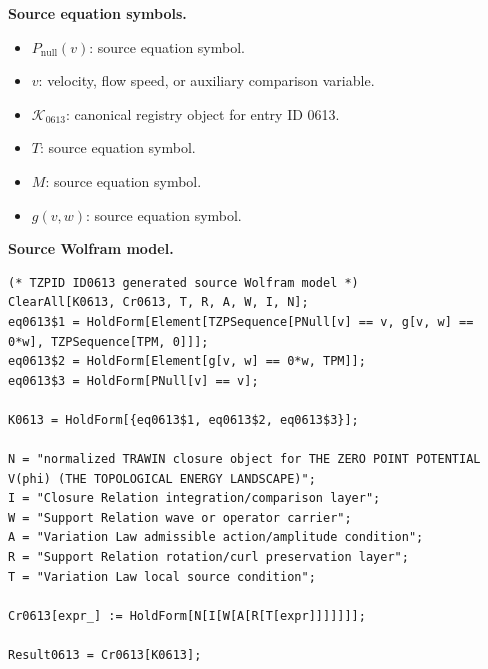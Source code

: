 \begin{minipage}[t]{0.49\linewidth}
\begingroup
\small
\raggedright
\textbf{Source equation symbols.}\par
\begin{itemize}[leftmargin=1.35em,itemsep=1pt,topsep=1pt,parsep=0pt]
    \item $P_{\mathrm{null}}(v)$: source equation symbol.
    \item $v$: velocity, flow speed, or auxiliary comparison variable.
    \item $\mathcal{K}_{0613}$: canonical registry object for entry ID 0613.
    \item $T$: source equation symbol.
    \item $M$: source equation symbol.
    \item $g(v,w)$: source equation symbol.
\end{itemize}
\endgroup
\end{minipage}\hfill
\begin{minipage}[t]{0.47\linewidth}
\begingroup
\scriptsize
\raggedright
\textbf{Source Wolfram model.}\par
\begin{Verbatim}[fontsize=\tiny,breaklines=true,breakanywhere=true]
(* TZPID ID0613 generated source Wolfram model *)
ClearAll[K0613, Cr0613, T, R, A, W, I, N];
eq0613$1 = HoldForm[Element[TZPSequence[PNull[v] == v, g[v, w] == 0*w], TZPSequence[TPM, 0]]];
eq0613$2 = HoldForm[Element[g[v, w] == 0*w, TPM]];
eq0613$3 = HoldForm[PNull[v] == v];

K0613 = HoldForm[{eq0613$1, eq0613$2, eq0613$3}];

N = "normalized TRAWIN closure object for THE ZERO POINT POTENTIAL V(phi) (THE TOPOLOGICAL ENERGY LANDSCAPE)";
I = "Closure Relation integration/comparison layer";
W = "Support Relation wave or operator carrier";
A = "Variation Law admissible action/amplitude condition";
R = "Support Relation rotation/curl preservation layer";
T = "Variation Law local source condition";

Cr0613[expr_] := HoldForm[N[I[W[A[R[T[expr]]]]]]];

Result0613 = Cr0613[K0613];
\end{Verbatim}
\endgroup
\end{minipage}

